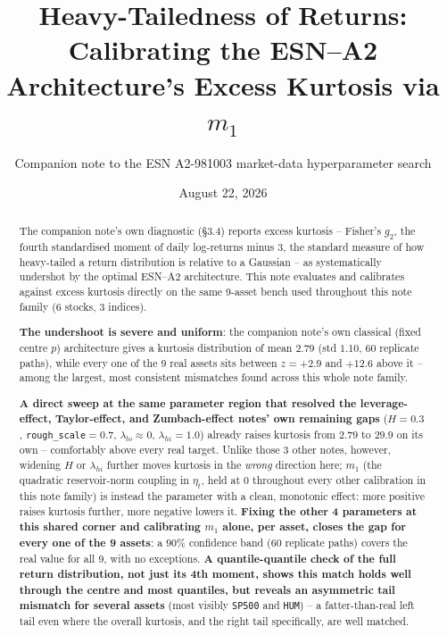 \documentclass[11pt]{article}
\title{Heavy-Tailedness of Returns: Calibrating the ESN--A2\\
Architecture's Excess Kurtosis via $m_1$}
\author{Companion note to the ESN A2-981003 market-data hyperparameter search}
\date{August 22, 2026}
\begin{document}
\maketitle

\begin{abstract}
The companion note's own diagnostic (\S3.4) reports excess kurtosis --
Fisher's $g_2$, the fourth standardised moment of daily log-returns minus 3,
the standard measure of how heavy-tailed a return distribution is relative to
a Gaussian -- as systematically undershot by the optimal ESN--A2
architecture. This note evaluates and calibrates against excess kurtosis
directly on the same 9-asset bench used throughout this note family (6
stocks, 3 indices).

\textbf{The undershoot is severe and uniform}: the companion note's own
classical (fixed centre $p$) architecture gives a kurtosis distribution of
mean $2.79$ (std $1.10$, 60 replicate paths), while every one of the 9 real
assets sits between $z=+2.9$ and $+12.6$ above it -- among the largest,
most consistent mismatches found across this whole note family.

\textbf{A direct sweep at the same parameter region that resolved the
leverage-effect, Taylor-effect, and Zumbach-effect notes' own remaining gaps}
($H=0.3$, \texttt{rough\_scale}$=0.7$, $\lambda_{lo}\approx0$,
$\lambda_{hi}=1.0$) already raises kurtosis from $2.79$ to $29.9$ on its own
-- comfortably above every real target. Unlike those 3 other notes, however,
widening $H$ or $\lambda_{hi}$ further moves kurtosis in the \emph{wrong}
direction here; $m_1$ (the quadratic reservoir-norm coupling in $\eta_t$,
held at $0$ throughout every other calibration in this note family) is
instead the parameter with a clean, monotonic effect: more positive raises
kurtosis further, more negative lowers it. \textbf{Fixing the other 4
parameters at this shared corner and calibrating $m_1$ alone, per asset,
closes the gap for every one of the 9 assets}: a $90\%$ confidence band (60
replicate paths) covers the real value for all 9, with no exceptions.
\textbf{A quantile-quantile check of the full return distribution, not just
its 4th moment, shows this match holds well through the centre and most
quantiles, but reveals an asymmetric tail mismatch for several assets}
(most visibly \texttt{SP500} and \texttt{HUM}) -- a fatter-than-real left
tail even where the overall kurtosis, and the right tail specifically, are
well matched.
\end{abstract}

\tableofcontents
\end{document}
